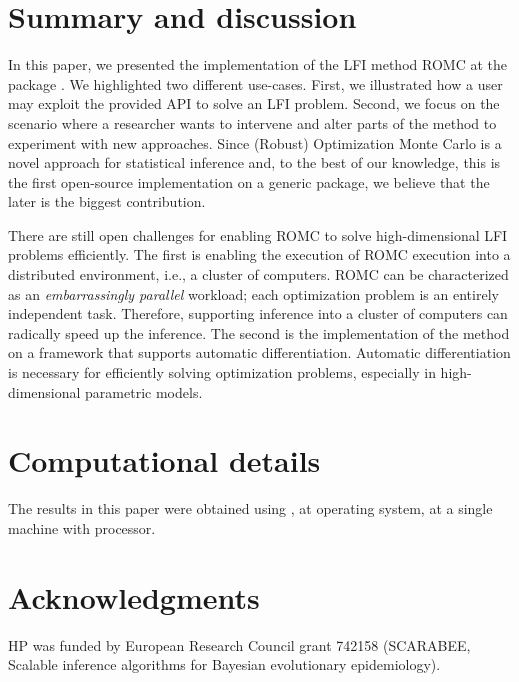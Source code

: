 \documentclass[nojss]{jss}
\begin{document}
\section{Summary and discussion} \label{sec:summary}

In this paper, we presented the implementation of the LFI method ROMC
at the  package . We highlighted two
different use-cases. First, we illustrated how a user may exploit the
provided API to solve an LFI problem. Second, we focus on the scenario
where a researcher wants to intervene and alter parts of the method to
experiment with new approaches. Since (Robust) Optimization Monte
Carlo is a novel approach for statistical inference and, to the best
of our knowledge, this is the first open-source implementation on a
generic package, we believe that the later is the biggest
contribution.

There are still open challenges for enabling ROMC to solve
high-dimensional LFI problems efficiently. The first is enabling the
execution of ROMC execution into a distributed environment, i.e., a
cluster of computers. ROMC can be characterized as an
\textit{embarrassingly parallel} workload; each optimization problem
is an entirely independent task. Therefore, supporting inference into
a cluster of computers can radically speed up the inference. The
second is the implementation of the method on a framework that supports
automatic differentiation. Automatic differentiation is necessary for
efficiently solving optimization problems, especially in
high-dimensional parametric models.



\section*{Computational details}

The results in this paper were obtained using ,
 at  operating system, at a
single machine with  processor.

\section*{Acknowledgments}

HP was funded by European Research Council grant 742158 (SCARABEE,
Scalable inference algorithms for Bayesian evolutionary epidemiology).

\clearpage


\end{document}
